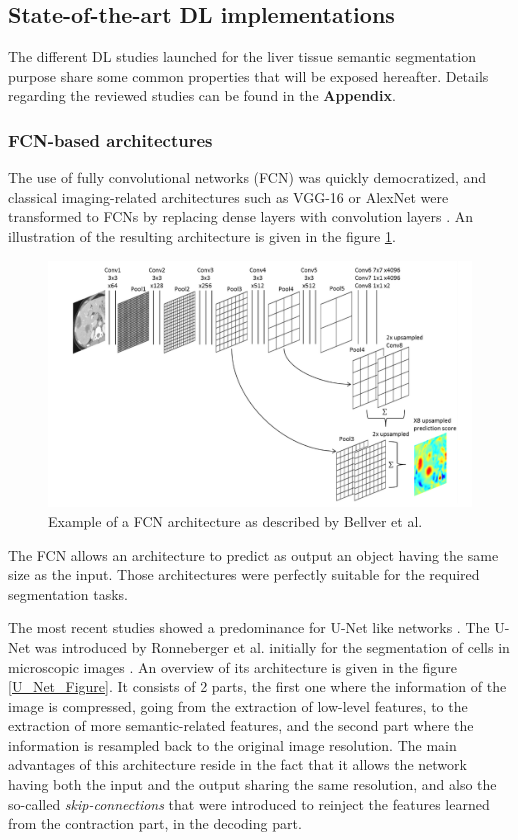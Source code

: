 \documentclass[]{article}
\begin{document}
\subsection*{State-of-the-art DL implementations}

The different DL studies launched for the liver tissue semantic
segmentation purpose share some common properties that will be exposed
hereafter. Details regarding the reviewed studies can be found in the
\textbf{Appendix}.

\subsubsection*{FCN-based architectures}

The use of fully convolutional networks (FCN) was quickly democratized,
and classical imaging-related architectures such as VGG-16 or AlexNet
were transformed to FCNs by replacing dense layers with convolution
layers \cite{Ben-Cohen, Bellver2017}. An illustration of the resulting architecture is given in the figure \ref{Bellver_FCN}. 

\begin{figure}[th!]
	\centering
	\includegraphics[width=0.7\linewidth]{images/image3}
	\caption{Example of a FCN architecture as described by Bellver et al. \cite{Bellver2017}}
	\label{Bellver_FCN}
\end{figure}


The FCN allows an architecture to predict as output an object having the
same size as the input. Those architectures were perfectly suitable for
the required segmentation tasks.

The most recent studies showed a predominance for U-Net like networks \cite{Vorontsov2018, Yuan2017}. The U-Net was
introduced by Ronneberger et al. initially for the segmentation of cells
in microscopic images \cite{Ronneberger2015}. An overview of its architecture is given in the
figure \ref{U_Net_Figure}. It consists of 2 parts, the first one where the
information of the image is compressed, going from the extraction of
low-level features, to the extraction of more semantic-related features,
and the second part where the information is resampled back to the
original image resolution. The main advantages of this architecture
reside in the fact that it allows the network having both the input and
the output sharing the same resolution, and also the so-called
\emph{skip-connections} that were introduced to reinject the features
learned from the contraction part, in the decoding part.
\end{document}
